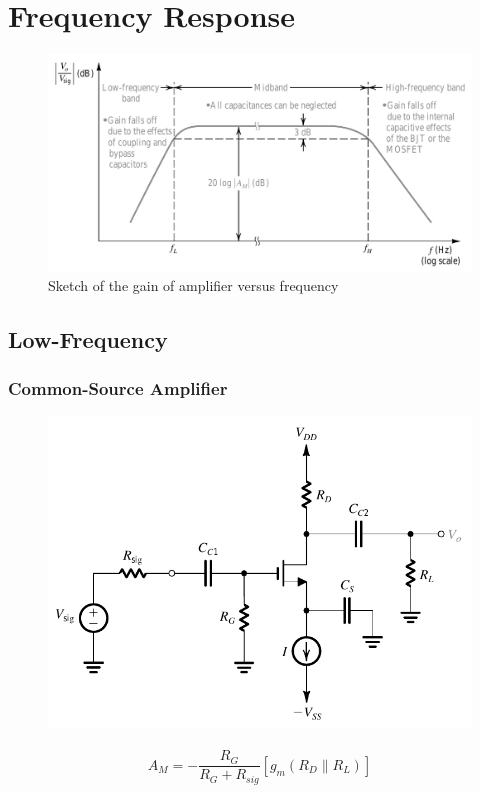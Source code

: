 \chapter{Frequency Response}

\begin{figure}[H]
  \centering
  \includegraphics[width=0.6\linewidth]{figures/Frequency-Response}
  \caption{Sketch of the gain of amplifier versus frequency}
  \label{fig:}
\end{figure}

\section{Low-Frequency}

\subsection{Common-Source Amplifier}

\begin{figure}[H]
  \centering
  \includegraphics[width=0.6\linewidth]{figures/Frequency-Response-CS}
  \label{fig:}
\end{figure}

\begin{equation*}
  \begin{aligned}
    A_M = - \dfrac{R_G}{R_G + R_{sig}} \left[ g_m \left( R_D \parallel R_L \right) \right]  
  \end{aligned}
\end{equation*}

